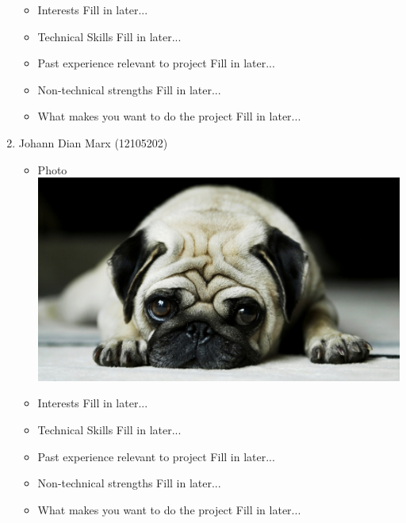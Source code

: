 \documentclass[12pt, oneside]{article}
\begin{document}
\begin{enumerate}
\begin{itemize}
			\item Interests\newline
				Fill in later...
			\item Technical Skills\newline
				Fill in later...
			\item Past experience relevant to project\newline
				Fill in later...
			\item Non-technical strengths\newline
				Fill in later...
			\item What makes you want to do the project\newline
				Fill in later...
		\end{itemize}
		\item {Johann Dian Marx (12105202)\par}
		\begin{itemize}
			\item Photo\newline
				\includegraphics[scale=0.1]{example} %
			\item Interests\newline
				Fill in later...
			\item Technical Skills\newline
				Fill in later...
			\item Past experience relevant to project\newline
				Fill in later...
			\item Non-technical strengths\newline
				Fill in later...
			\item What makes you want to do the project\newline
				Fill in later...
		\end{itemize}

\end{enumerate}
\end{document}
